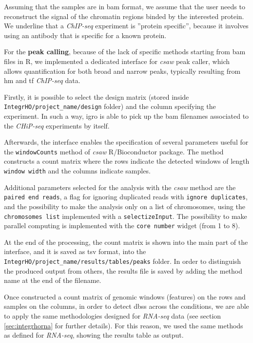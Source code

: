 
Assuming that the samples are in \gls{bam} format, we assume that the user needs to reconstruct the signal of the chromatin regions binded by the interested protein.
We underline that a \textit{ChIP-seq} experiment is ''protein specific'', because it involves using an antibody that is specific for a known protein.

For the \textbf{peak calling}, because of the lack of specific methods starting from \gls{bam} files in R, we implemented a dedicated interface for \textit{csaw} \cite{Lun2015} peak caller, which allows quantification for both broad and narrow peaks, typically resulting from \gls{hm} and \gls{tf} \textit{ChIP-seq} data.

Firstly, it is possible to select the design matrix (stored inside \lstinline!IntegrHO/project_name/design! folder) and the column specifying the experiment.
In such a way, \gls{igro} is able to pick up the \gls{bam} filenames associated to the \textit{CHiP-seq} experiments by itself.

Afterwards, the interface enables the specification of several parameters useful for the \lstinline!windowCounts! method of \textit{csaw} R/Bioconductor package.
The method constructs a count matrix where the rows indicate the detected windows of length \lstinline!window width! and the columns indicate samples.

Additional parameters selected for the analysis with the \textit{csaw} method are the \lstinline!paired end reads!, a flag for ignoring duplicated reads with \lstinline!ignore duplicates!, and the possibility to make the analysis only on a list of chromosomes, using the \lstinline!chromosomes list! implemented with a \lstinline!selectizeInput!.
The possibility to make parallel computing is implemented with the \lstinline!core number! widget (from 1 to 8).

At the end of the processing, the count matrix is shown into the main part of the interface, and it is saved as \gls{tsv} format, into the \lstinline!IntegrHO/project_name/results/tables/peaks! folder.
In order to distinguish the produced output from others, the results file is saved by adding the method name at the end of the filename.

Once constructed a count matrix of genomic windows (features) on the rows and samples on the columns, in order to detect \glspl{dbs} across the conditions, we are able to apply the same methodologies designed for \textit{RNA-seq} data (see section \ref{sec:integrhorna} for further details).
For this reason, we used the same methods as defined for \textit{RNA-seq}, showing the results table as output.

